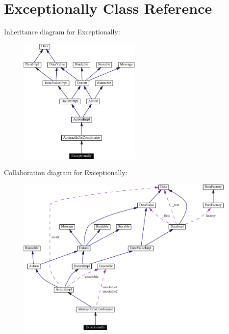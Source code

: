 \hypertarget{classExceptionally}{
\section{Exceptionally  Class Reference}
\label{classExceptionally}
}
Inheritance diagram for Exceptionally:\begin{figure}[H]
\begin{center}
\leavevmode
\includegraphics[width=170pt]{classExceptionally__inherit__graph}
\end{center}
\end{figure}
Collaboration diagram for Exceptionally:\begin{figure}[H]
\begin{center}
\leavevmode
\includegraphics[width=308pt]{classExceptionally__coll__graph}
\end{center}
\end{figure}

